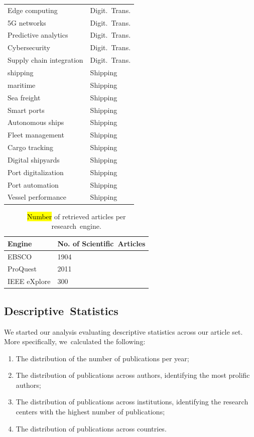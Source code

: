 \documentclass[jmse,review,accept,pdftex,moreauthors]{Definitions/mdpi}
\begin{document}
\begin{table}[H]
\begin{tabularx}{\linewidth}{XX}
		Edge computing & Digit.~Trans. \\
		5G networks & Digit.~Trans. \\
		Predictive analytics & Digit.~Trans. \\
		Cybersecurity & Digit.~Trans. \\
		Supply chain integration & Digit.~Trans. \\
		shipping & Shipping \\
		maritime & Shipping \\
		Sea freight & Shipping \\
		Smart ports & Shipping \\
		Autonomous ships & Shipping \\
		Fleet management & Shipping \\
		Cargo tracking & Shipping \\
		Digital shipyards & Shipping \\
		Port digitalization & Shipping \\
		Port automation & Shipping \\
		Vessel performance & Shipping \\
		\bottomrule
	\end{tabularx}
	\label{tab:keywords}
\end{table}

\vspace{-9pt}
\begin{table}[H]

	\caption{\hl{Number} %
 of retrieved articles per research~engine.}
	\begin{tabularx}{\linewidth}{XX}
		\toprule
		\textbf{Engine} & \textbf{No. of Scientific~Articles} \\
		\midrule
		EBSCO & 1904 \\
		ProQuest & 2011 \\
		IEEE eXplore & 300 \\
		\bottomrule
	\end{tabularx}
	\label{tab:searchres}
\end{table}

\subsection{Descriptive~Statistics}
We started our analysis evaluating descriptive statistics across our article set. More specifically, we~calculated the following:
\begin{enumerate}
	\item The distribution of the number of publications per year;
	\item The distribution of publications across authors, identifying the most prolific authors;
	\item The distribution of publications across institutions, identifying the research centers with the highest number of publications;
	\item The distribution of publications across countries.
\end{enumerate}
\end{document}
